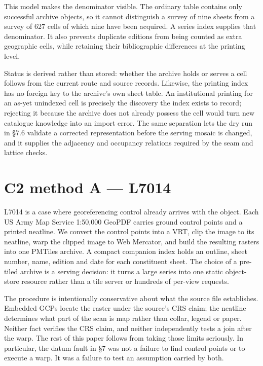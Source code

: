\documentclass[11pt,a4paper]{article}
\begin{document}
This model makes the denominator visible. The ordinary \texttt{} table contains only successful archive objects, so it cannot distinguish a survey of nine sheets from a survey of 627 cells of which nine have been acquired. A series index supplies that denominator. It also prevents duplicate editions from being counted as extra geographic cells, while retaining their bibliographic differences at the printing level.

Status is derived rather than stored: whether the archive holds or serves a cell follows from the current route and source records. Likewise, the printing index has no foreign key to the archive's own sheet table. An institutional printing for an as-yet unindexed cell is precisely the discovery the index exists to record; rejecting it because the archive does not already possess the cell would turn new catalogue knowledge into an import error. The same separation lets the dry run in §7.6 validate a corrected representation before the serving mosaic is changed, and it supplies the adjacency and occupancy relations required by the seam and lattice checks.

\section{C2 method A — L7014}

L7014 is a case where georeferencing control already arrives with the object. Each US Army Map Service 1:50,000 GeoPDF carries ground control points and a printed neatline. We convert the control points into a VRT, clip the image to its neatline, warp the clipped image to Web Mercator, and build the resulting rasters into one PMTiles archive. A compact companion index holds an outline, sheet number, name, edition and date for each constituent sheet. The choice of a pre-tiled archive is a serving decision: it turns a large series into one static object-store resource rather than a tile server or hundreds of per-view requests.

The procedure is intentionally conservative about what the source file establishes. Embedded GCPs locate the raster under the source's CRS claim; the neatline determines what part of the scan is map rather than collar, legend or paper. Neither fact verifies the CRS claim, and neither independently tests a join after the warp. The rest of this paper follows from taking those limits seriously. In particular, the datum fault in §7 was not a failure to find control points or to execute a warp. It was a failure to test an assumption carried by both.
\end{document}
